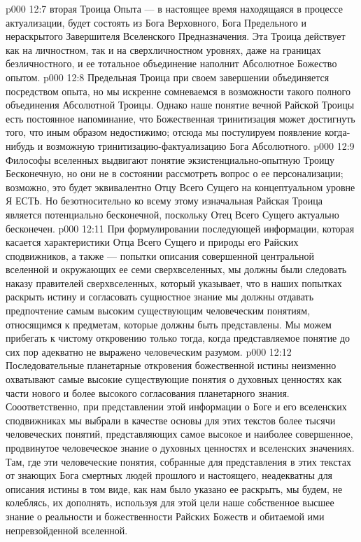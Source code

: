 \vs p000 12:7 \bibnobreakspace {} вторая Троица Опыта --- в настоящее время находящаяся в процессе актуализации, будет состоять из Бога Верховного, Бога Предельного и нераскрытого Завершителя Вселенского Предназначения. Эта Троица действует как на личностном, так и на сверхличностном уровнях, даже на границах безличностного, и ее тотальное объединение наполнит Абсолютное Божество опытом.
\vs p000 12:8 \pc Предельная Троица при своем завершении объединяется посредством опыта, но мы искренне сомневаемся в возможности такого полного объединения Абсолютной Троицы. Однако наше понятие вечной Райской Троицы есть постоянное напоминание, что Божественная тринитизация может достигнуть того, что иным образом недостижимо; отсюда мы постулируем появление когда\hyp{}нибудь  и возможную тринитизацию\hyp{}фактуализацию Бога Абсолютного.
\vs p000 12:9 \pc Философы вселенных выдвигают понятие  экзистенциально\hyp{}опытную Троицу Бесконечную, но они не в состоянии рассмотреть вопрос о ее персонализации; возможно, это будет эквивалентно Отцу Всего Сущего на концептуальном уровне Я ЕСТЬ. Но безотносительно ко всему этому изначальная Райская Троица является потенциально бесконечной, поскольку Отец Всего Сущего актуально бесконечен.
\vs p000 12:11 При формулировании последующей информации, которая касается характеристики Отца Всего Сущего и природы его Райских сподвижников, а также --- попытки описания совершенной центральной вселенной и окружающих ее семи сверхвселенных, мы должны были следовать наказу правителей сверхвселенных, который указывает, что в наших попытках раскрыть истину и согласовать сущностное знание мы должны отдавать предпочтение самым высоким существующим человеческим понятиям, относящимся к предметам, которые должны быть представлены. Мы можем прибегать к чистому откровению только тогда, когда представляемое понятие до сих пор адекватно не выражено человеческим разумом.
\vs p000 12:12 Последовательные планетарные откровения божественной истины неизменно охватывают самые высокие существующие понятия о духовных ценностях как части нового и более высокого согласования планетарного знания. Сооответственно, при представлении этой информации о Боге и его вселенских сподвижниках мы выбрали в качестве основы для этих текстов более тысячи человеческих понятий, представляющих самое высокое и наиболее совершенное, продвинутое человеческое знание о духовных ценностях и вселенских значениях. Там, где эти человеческие понятия, собранные для представления в этих текстах от знающих Бога смертных людей прошлого и настоящего, неадекватны для описания истины в том виде, как нам было указано ее раскрыть, мы будем, не колеблясь, их дополнять, используя для этой цели наше собственное высшее знание о реальности и божественности Райских Божеств и обитаемой ими непревзойденной вселенной.

